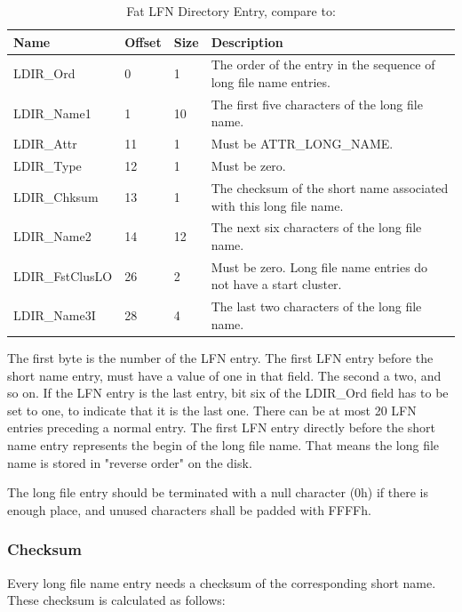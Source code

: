 \begin{table}[!ht]
\caption{Fat LFN Directory Entry, compare to: \cite{usb_ms_jan, fatgen103}}
\centering
\begin{tabular}{|l|l|l|p{8.5cm}|}
\hline\hline
\textbf{Name} & \textbf{Offset} & \textbf{Size} & \textbf{Description}\\ \hline
LDIR\_Ord & 0 & 1 & The order of the entry in the sequence of long file name entries. \\ \hline
LDIR\_Name1 & 1 & 10 & The first five characters of the long file name. \\ \hline
LDIR\_Attr & 11 & 1 & Must be ATTR\_LONG\_NAME. \\ \hline
LDIR\_Type & 12 & 1 & Must be zero. \\ \hline
LDIR\_Chksum & 13 & 1 & The checksum of the short name associated with this long file name. \\ \hline
LDIR\_Name2& 14 & 12 & The next six characters of the long file name. \\ \hline
LDIR\_FstClusLO & 26 & 2 & Must be zero. Long file name entries do not have a start cluster. \\ \hline
LDIR\_Name3I & 28 & 4 & The last two characters of the long file name. \\ \hline
\end{tabular}
\label{table:fat_lfn_dir_entry}
\end{table}

The first byte is the number of the LFN entry. The first LFN entry before the short name entry, must have a value of one in that field. The second a two, and so on. If the LFN entry is the last entry, bit six of the LDIR\_Ord field has to be set to one, to indicate that it is the last one. There can be at most 20 LFN entries preceding a normal entry. The first LFN entry directly before the short name entry represents the begin of the long file name. That means the long file name is stored in "reverse order" on the disk. 

The long file entry should be terminated with a null character (0h) if there is enough place, and unused characters shall be padded with FFFFh.

\subsubsection{Checksum}

Every long file name entry needs a checksum of the corresponding short name. These checksum is calculated as follows:

